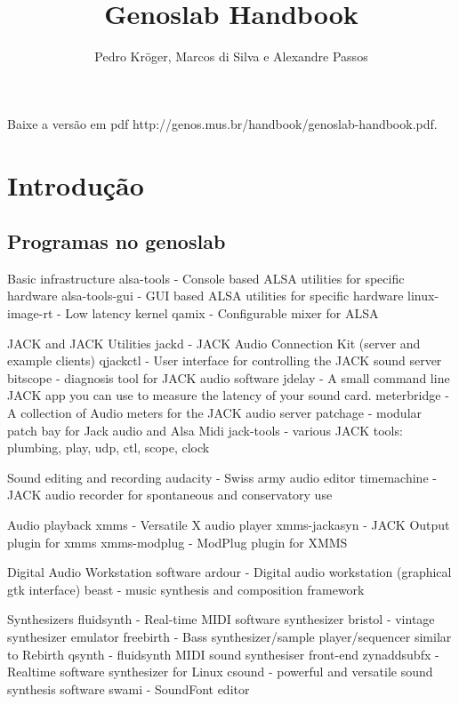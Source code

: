\documentclass[12pt,brazil]{book}
\title{Genoslab Handbook}
\author{Pedro Kröger, Marcos di Silva e Alexandre Passos}
\begin{document}
\graphicspath{{figs/}}

\maketitle

\begin{htmlonly}
  Baixe a versão em pdf 
  {http://genos.mus.br/handbook/genoslab-handbook.pdf}.
\end{htmlonly}

\tableofcontents

\part{Introdução}
\label{part:introducao}

\chapter{Programas no genoslab}
\label{cha:progr-no-genosl}

Basic infrastructure
      alsa-tools - Console based ALSA utilities for specific hardware
      alsa-tools-gui - GUI based ALSA utilities for specific hardware
      linux-image-rt - Low latency kernel
      qamix - Configurable mixer for ALSA

JACK and JACK Utilities
      jackd - JACK Audio Connection Kit (server and example clients)
      qjackctl - User interface for controlling the JACK sound server
      bitscope - diagnosis tool for JACK audio software
      jdelay - A small command line JACK app you can use to measure the latency of your sound card.
      meterbridge - A collection of Audio meters for the JACK audio server
      patchage - modular patch bay for Jack audio and Alsa Midi
      jack-tools - various JACK tools: plumbing, play, udp, ctl, scope, clock

Sound editing and recording
      audacity - Swiss army audio editor
      timemachine - JACK audio recorder for spontaneous and conservatory use

Audio playback
      xmms - Versatile X audio player
      xmms-jackasyn - JACK Output plugin for xmms
      xmms-modplug - ModPlug plugin for XMMS

Digital Audio Workstation software
      ardour - Digital audio workstation (graphical gtk interface)
      beast - music synthesis and composition framework

Synthesizers
      fluidsynth - Real-time MIDI software synthesizer
      bristol - vintage synthesizer emulator
      freebirth - Bass synthesizer/sample player/sequencer similar to Rebirth
      qsynth - fluidsynth MIDI sound synthesiser front-end
      zynaddsubfx - Realtime software synthesizer for Linux
      csound - powerful and versatile sound synthesis software
      swami - SoundFont editor
\end{document}
